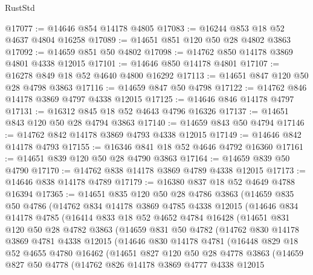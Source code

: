 \begin{lexlean}{RustStd}
\begin{coremodule}
@17077 := @14646 @854 @14178 @4805
@17083 := @16244 @853 @18 @52 @4637 @4804 @16258
@17089 := @14651 @851 @120 @50 @28 @4802 @3863
@17092 := @14659 @851 @50 @4802
@17098 := @14762 @850 @14178 @3869 @4801 @4338 @12015
@17101 := @14646 @850 @14178 @4801
@17107 := @16278 @849 @18 @52 @4640 @4800 @16292
@17113 := @14651 @847 @120 @50 @28 @4798 @3863
@17116 := @14659 @847 @50 @4798
@17122 := @14762 @846 @14178 @3869 @4797 @4338 @12015
@17125 := @14646 @846 @14178 @4797
@17131 := @16312 @845 @18 @52 @4643 @4796 @16326
@17137 := @14651 @843 @120 @50 @28 @4794 @3863
@17140 := @14659 @843 @50 @4794
@17146 := @14762 @842 @14178 @3869 @4793 @4338 @12015
@17149 := @14646 @842 @14178 @4793
@17155 := @16346 @841 @18 @52 @4646 @4792 @16360
@17161 := @14651 @839 @120 @50 @28 @4790 @3863
@17164 := @14659 @839 @50 @4790
@17170 := @14762 @838 @14178 @3869 @4789 @4338 @12015
@17173 := @14646 @838 @14178 @4789
@17179 := @16380 @837 @18 @52 @4649 @4788 @16394
@17365 := @14651
    @835
    @120
    @50
    @28
    @4786
    @3863
    (@14659
      @835
      @50
      @4786
      (@14762
        @834
        @14178
        @3869
        @4785
        @4338
        @12015
        (@14646
          @834
          @14178
          @4785
          (@16414
            @833
            @18
            @52
            @4652
            @4784
            @16428
            (@14651
              @831
              @120
              @50
              @28
              @4782
              @3863
              (@14659
                @831
                @50
                @4782
                (@14762
                  @830
                  @14178
                  @3869
                  @4781
                  @4338
                  @12015
                  (@14646
                    @830
                    @14178
                    @4781
                    (@16448
                      @829
                      @18
                      @52
                      @4655
                      @4780
                      @16462
                      (@14651
                        @827
                        @120
                        @50
                        @28
                        @4778
                        @3863
                        (@14659
                          @827
                          @50
                          @4778
                          (@14762
                            @826
                            @14178
                            @3869
                            @4777
                            @4338
                            @12015

\end{coremodule}
\end{lexlean}
